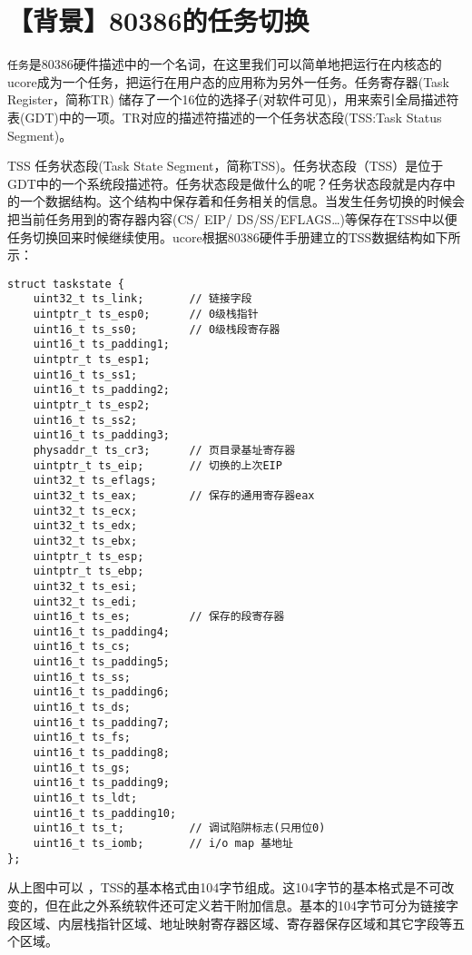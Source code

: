\section{【背景】80386的任务切换}\label{ux80ccux666f80386ux7684ux4efbux52a1ux5207ux6362}

\lstinline!任务!是80386硬件描述中的一个名词，在这里我们可以简单地把运行在内核态的ucore成为一个任务，把运行在用户态的应用称为另外一任务。任务寄存器(Task
Register，简称TR)
储存了一个16位的选择子(对软件可见)，用来索引全局描述符表(GDT)中的一项。TR对应的描述符描述的一个任务状态段(TSS:Task
Status Segment)。

TSS 任务状态段(Task State
Segment，简称TSS)。任务状态段（TSS）是位于GDT中的一个系统段描述符。任务状态段是做什么的呢？任务状态段就是内存中的一个数据结构。这个结构中保存着和任务相关的信息。当发生任务切换的时候会把当前任务用到的寄存器内容(CS/
EIP/
DS/SS/EFLAGS\ldots{})等保存在TSS中以便任务切换回来时候继续使用。ucore根据80386硬件手册建立的TSS数据结构如下所示：

\begin{lstlisting}
struct taskstate {                                                                                 
    uint32_t ts_link;       // 链接字段
    uintptr_t ts_esp0;      // 0级栈指针
    uint16_t ts_ss0;        // 0级栈段寄存器
    uint16_t ts_padding1;
    uintptr_t ts_esp1;
    uint16_t ts_ss1;
    uint16_t ts_padding2;
    uintptr_t ts_esp2;
    uint16_t ts_ss2;
    uint16_t ts_padding3;
    physaddr_t ts_cr3;      // 页目录基址寄存器
    uintptr_t ts_eip;       // 切换的上次EIP
    uint32_t ts_eflags;
    uint32_t ts_eax;        // 保存的通用寄存器eax
    uint32_t ts_ecx;
    uint32_t ts_edx;
    uint32_t ts_ebx;
    uintptr_t ts_esp;
    uintptr_t ts_ebp;
    uint32_t ts_esi;
    uint32_t ts_edi;
    uint16_t ts_es;         // 保存的段寄存器
    uint16_t ts_padding4;
    uint16_t ts_cs;
    uint16_t ts_padding5;
    uint16_t ts_ss;
    uint16_t ts_padding6;
    uint16_t ts_ds;
    uint16_t ts_padding7;
    uint16_t ts_fs;
    uint16_t ts_padding8;
    uint16_t ts_gs;
    uint16_t ts_padding9;
    uint16_t ts_ldt;
    uint16_t ts_padding10;
    uint16_t ts_t;          // 调试陷阱标志(只用位0)
    uint16_t ts_iomb;       // i/o map 基地址
};
\end{lstlisting}

从上图中可以
，TSS的基本格式由104字节组成。这104字节的基本格式是不可改变的，但在此之外系统软件还可定义若干附加信息。基本的104字节可分为链接字段区域、内层栈指针区域、地址映射寄存器区域、寄存器保存区域和其它字段等五个区域。

